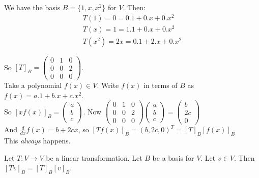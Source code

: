 \begin{examples}
\begin{itemize}
We have the basis $B = \{1,x,x^2\}$ for $V$. Then:
\[
\begin{aligned}
T(1) = 0 = 0.1 + 0.x + 0.x^2 \\
T(x) = 1 = 1.1 + 0.x + 0.x^2 \\
T(x^2) = 2x = 0.1 + 2.x + 0.x^2
\end{aligned}\]


So $[T]_B = \begin{pmatrix}
 0 & 1 & 0 \\ 0 & 0 & 2 \\ 0 & 0 & 0
 \end{pmatrix}$.\\
 
 Take a polynomial $f(x) \in V$. Write $f(x)$ in terms of $B$ as $f(x) = a.1 + b.x + c.x^2$.\\
 
 So $[xf(x)]_B = \begin{pmatrix}
 a \\ b \\ c
 \end{pmatrix}
$. Now $\begin{pmatrix}
 0 & 1 & 0 \\ 0 & 0 & 2 \\ 0 & 0 & 0

\end{pmatrix}\begin{pmatrix} 
a \\ b \\ c
\end{pmatrix} = \begin{pmatrix}
 b \\ 2c \\ 0
 \end{pmatrix}$\\
 
 And $\frac{d}{dx} f(x) = b + 2cx$, so $[Tf(x)]_B = (b, 2c, 0)^T = [T]_B[f(x)]_B$\\
 This \emph{always} happens. 
\end{itemize}
\end{examples}\vspace*{10pt}

\begin{proposition} Let $T: V \to V$ be a linear transformation. Let $B$ be a basis for $V$. Let $v \in V$. Then $[Tv]_B = [T]_B[v]_B$. 	
\end{proposition}


